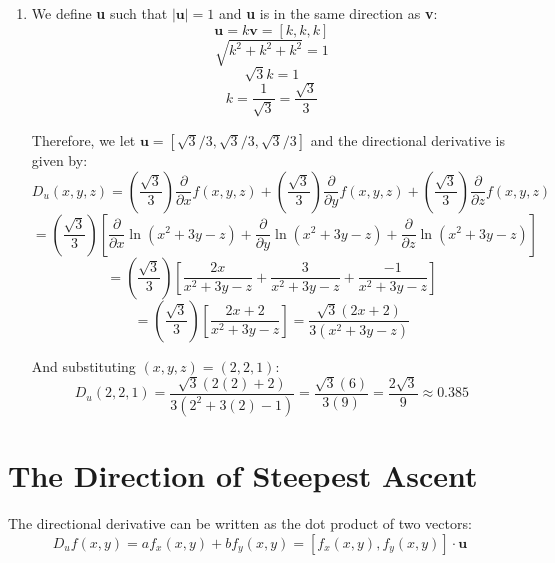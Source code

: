 \begin{Answer}[ref = direction]
\begin{enumerate}
    And substituting $(x, y) = (2, 4)$:
    $$D_u(2, 4) = \left( \frac{2\sqrt{5}}{5} \right) \left[ 2(2)(4) + 4^3 
    \right] + \left( \frac{-\sqrt{5}}{5} \right) \left[ 2^2 + 3(2)(4^2) 
    \right]$$
    $$D_u(2, 4) = \left( \frac{2\sqrt{5}}{5} \right) \left[ 80 \right] + \left(
    \frac{-\sqrt{5}}{5} \right) \left[ 100 \right]$$
    $$D_u(2, 4) = 32\sqrt{5} - 20\sqrt{5} = 12\sqrt{5} \approx 26.833$$

    \item We define \textbf{u} such that $| \textbf{u} | = 1$ and \textbf{u} 
    is in the same direction as \textbf{v}:
    $$\textbf{u} = k\textbf{v} = \left[k, k, k \right]$$
    $$\sqrt{k^2 + k^2 + k^2} = 1$$
    $$\sqrt{3}k = 1$$
    $$k = \frac{1}{\sqrt{3}} = \frac{\sqrt{3}}{3}$$

    Therefore, we let $\textbf{u} = \left[ \sqrt{3}/3, \sqrt{3}/3, \sqrt{3}/3 
    \right]$ and the directional derivative is given by:
    $$D_u(x, y, z) = \left( \frac{\sqrt{3}}{3} \right) \frac{\partial}{
    \partial x} f(x, y, z) + \left( \frac{\sqrt{3}}{3} \right) \frac{
    \partial}{\partial y}f(x, y, z) + \left( \frac{\sqrt{3}}{3} \right) 
    \frac{\partial}{\partial z} f(x, y, z)$$
    $$= \left( \frac{\sqrt{3}}{3} \right) \left[ \frac{\partial}{\partial x} 
    \ln{ \left( x^2 + 3y - z \right)} + \frac{\partial}{\partial y} \ln{ 
    \left( x^2 + 3y - z \right)} + \frac{\partial}{\partial z} \ln{ \left( 
    x^2 + 3y - z \right)} \right]$$
    $$= \left( \frac{\sqrt{3}}{3} \right) \left[ \frac{2x}{x^2 + 3y - z} + 
    \frac{3}{x^2 + 3y - z} + \frac{-1}{x^2 + 3y - z} \right]$$
    $$= \left( \frac{\sqrt{3}}{3} \right) \left[ \frac{2x + 2}{x^2 + 3y - z} 
    \right] = \frac{\sqrt{3} \left( 2x + 2 \right)}{3 \left( x^2 + 3y - z 
    \right)}$$

    And substituting $(x, y, z) = (2, 2, 1)$:
    $$D_u(2, 2, 1) = \frac{\sqrt{3} \left( 2(2) + 2 \right)}{3 \left( 2^2 + 
    3(2) - 1 \right)} = \frac{\sqrt{3} \left( 6 \right)}{3 \left( 9 \right)} 
    = \frac{2\sqrt{3}}{9} \approx 0.385$$
\end{enumerate}
\end{Answer}

\section{The Direction of Steepest Ascent}
The directional derivative can be written as the dot product of two vectors:
$$D_u f(x, y) = af_x(x, y) + bf_y(x, y) = \left[ f_x(x, y), f_y(x, y) \right] 
\cdot \textbf{u}$$

